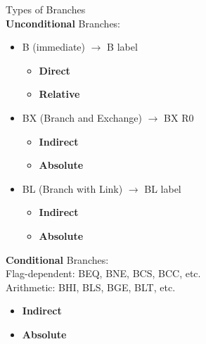 \begin{corollary}{Types of Branches}\\
\textcolor{darkcorn}{\textbf{Unconditional}} Branches:
\begin{itemize}
    \item B (immediate)  $\rightarrow$ B label
    \begin{itemize}
        \item \textcolor{darktangerine}{\textbf{Direct}}
        \item \textcolor{darkfrog}{\textbf{Relative}}
    \end{itemize}
    \item BX (Branch and Exchange) $\rightarrow$ BX R0
    \begin{itemize}
        \item \textcolor{darktangerine}{\textbf{Indirect}}
        \item \textcolor{darkfrog}{\textbf{Absolute}}
    \end{itemize}
    \item BL (Branch with Link) $\rightarrow$ BL label
    \begin{itemize} 
        \item \textcolor{darktangerine}{\textbf{Indirect}}
        \item \textcolor{darkfrog}{\textbf{Absolute}}
    \end{itemize}
\end{itemize}

\textcolor{darkcorn}{\textbf{Conditional}} Branches:\\
Flag-dependent: BEQ, BNE, BCS, BCC, etc.\\
Arithmetic: BHI, BLS, BGE, BLT, etc.
\begin{itemize}
    \item \textcolor{darktangerine}{\textbf{Indirect}}
    \item \textcolor{darkfrog}{\textbf{Absolute}}
\end{itemize}
\end{corollary}



